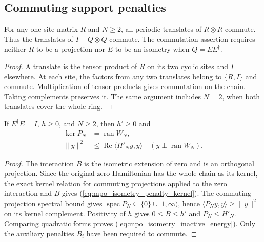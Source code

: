 \subsection{Commuting support penalties}

\begin{lemma}
    \label{thm:mpo_isometry_support_commute}
    \leanok
    For any one-site matrix $R$ and $N\geq2$, all periodic translates
    of $R\otimes R$ commute. Thus the translates of $I-Q\otimes Q$
    commute. The commutation assertion requires neither $R$ to be a
    projection nor $E$ to be an isometry when $Q=EE^\dagger$.
\end{lemma}
\begin{proof}\leanok
    A translate is the tensor product of $R$ on its two cyclic sites
    and $I$ elsewhere. At each site, the factors from any two translates
    belong to $\{R,I\}$ and commute. Multiplication of tensor products
    gives commutation on the chain. Taking complements preserves it.
    The same argument includes $N=2$, when both translates cover the
    whole ring.
\end{proof}

\begin{lemma}
    \label{thm:mpo_isometry_inactive_bound}
    \leanok
    If $E^\dagger E=I$, $h\geq0$, and $N\geq2$, then $h'\geq0$ and
    \begin{align}
        \ker P_N & =\operatorname{ran}W_N,
        \label{eq:mpo_isometry_penalty_kernel}                 \\
        \|y\|^2  & \leq\operatorname{Re}\langle H'_Ny,y\rangle
        \quad (y\perp\operatorname{ran}W_N).
        \label{eq:mpo_isometry_inactive_energy}
    \end{align}
\end{lemma}
\begin{proof}\leanok
    The interaction $B$ is the isometric extension of zero and is an
    orthogonal projection. Since the original zero Hamiltonian has the
    whole chain as its kernel, the exact kernel relation for commuting
    projections applied to the zero interaction and $B$ gives
    (\ref{eq:mpo_isometry_penalty_kernel}). The commuting-projection
    spectral bound gives $\operatorname{spec}P_N\subseteq
        \{0\}\cup[1,\infty)$, hence
    $\langle P_Ny,y\rangle\geq\|y\|^2$ on its kernel complement.
    Positivity of $h$ gives $0\leq B\leq h'$ and $P_N\leq H'_N$.
    Comparing quadratic forms proves
    (\ref{eq:mpo_isometry_inactive_energy}). Only the auxiliary
    penalties $B_i$ have been required to commute.
\end{proof}

